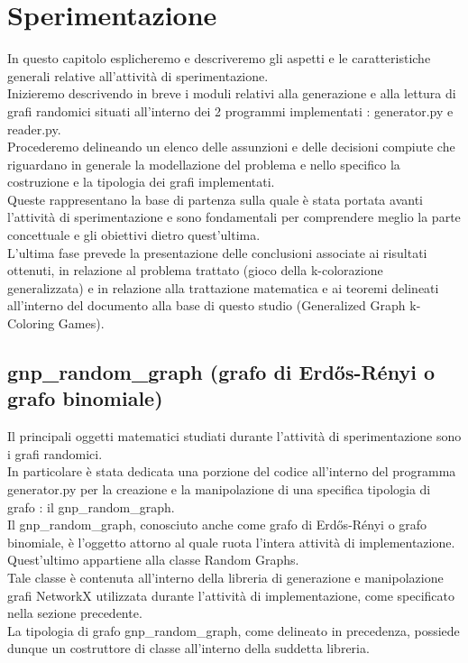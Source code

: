 \chapter{Sperimentazione}

In questo capitolo esplicheremo e descriveremo gli aspetti e le caratteristiche generali relative all'attività di sperimentazione.\\

Inizieremo descrivendo in breve i moduli relativi alla generazione e alla lettura di grafi randomici situati all'interno dei 2 programmi implementati : generator.py e reader.py.\\

Procederemo delineando un elenco delle assunzioni e delle decisioni compiute che riguardano in generale la modellazione del problema e nello specifico la costruzione e la tipologia dei grafi implementati.\\
Queste rappresentano la base di partenza sulla quale è stata portata avanti l'attività di sperimentazione e sono fondamentali per comprendere meglio la parte concettuale e gli obiettivi dietro quest'ultima.\\

L'ultima fase prevede la presentazione delle conclusioni associate ai risultati ottenuti, in relazione al problema trattato (gioco della k-colorazione generalizzata) e in relazione alla trattazione matematica e ai teoremi delineati all'interno del documento alla base di questo studio (Generalized Graph k-Coloring Games).\\

\section{gnp\_random\_graph (grafo di Erdős-Rényi o grafo binomiale)}
\justify
Il principali oggetti matematici studiati durante l'attività di sperimentazione sono i grafi randomici.\\

In particolare è stata dedicata una porzione del codice all'interno del programma generator.py per la creazione e la manipolazione di una specifica tipologia di grafo : il gnp\_random\_graph.\\

Il gnp\_random\_graph, conosciuto anche come grafo di Erdős-Rényi o grafo binomiale, è l'oggetto attorno al quale ruota l'intera attività di implementazione.\\ Quest'ultimo appartiene alla classe Random Graphs.\\
Tale classe è contenuta all'interno della libreria di generazione e manipolazione grafi NetworkX utilizzata durante l'attività di implementazione, come specificato nella sezione precedente.\\
La tipologia di grafo gnp\_random\_graph, come delineato in precedenza, possiede dunque un costruttore di classe all'interno della suddetta libreria.\\

